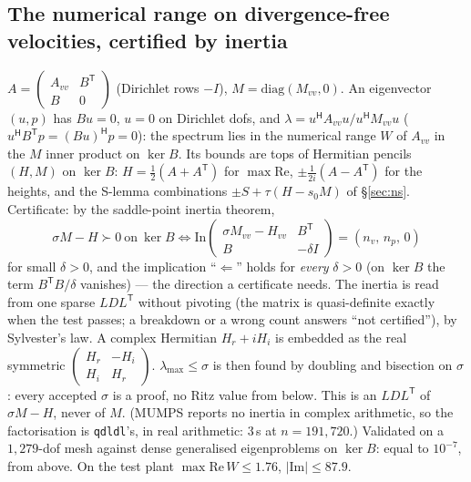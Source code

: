\documentclass[11pt,a4paper]{article}
\newcommand{\code}[1]{\texttt{#1}}
\newcommand{\hp}{^{\mathsf H}}
\newcommand{\tp}{^{\mathsf T}}   %
\begin{document}
{\subsection{The numerical range on divergence-free velocities, certified by inertia}
$A=\begin{pmatrix}A_{vv}&B\tp\\B&0\end{pmatrix}$ (Dirichlet rows $-I$), $M=\mathrm{diag}(M_{vv},0)$.
An eigenvector $(u,p)$ has $Bu=0$, $u=0$ on Dirichlet dofs, and
$\lambda=u\hp A_{vv}u/u\hp M_{vv}u$ ($u\hp B\tp p=(Bu)\hp p=0$): the spectrum lies in the
numerical range $W$ of $A_{vv}$ in the $M$ inner product on $\ker B$.  Its bounds are tops of
Hermitian pencils $(H,M)$ on $\ker B$: $H=\tfrac12(A+A\tp)$ for $\max\mathrm{Re}$, $\pm\tfrac1{2i}(A-A\tp)$
for the heights, and the S-lemma combinations $\pm S+\tau(H-s_0M)$ of \S\ref{sec:ns}.
Certificate: by the saddle-point inertia theorem,
\[
\sigma M-H\succ0\ \text{on}\ \ker B
\iff
\mathrm{In}\begin{pmatrix}\sigma M_{vv}-H_{vv}&B\tp\\B&-\delta I\end{pmatrix}=(n_v,\,n_p,\,0)
\]
for small $\delta>0$, and the implication ``$\Leftarrow$'' holds for \emph{every} $\delta>0$ (on
$\ker B$ the term $B\tp B/\delta$ vanishes) --- the direction a certificate needs.  The
inertia is read from one sparse $LDL\tp$ without pivoting (the matrix is quasi-definite
exactly when the test passes; a breakdown or a wrong count answers ``not certified''), by
Sylvester's law.  A complex Hermitian $H_r+iH_i$ is embedded as the real symmetric
$\begin{pmatrix}H_r&-H_i\\H_i&H_r\end{pmatrix}$.  $\lambda_{\max}\le\sigma$ is then found by doubling and
bisection on $\sigma$: every accepted $\sigma$ is a proof, no Ritz value from below.  This is
an $LDL\tp$ of $\sigma M-H$, never of $M$.  (MUMPS reports no inertia in complex arithmetic,
so the factorisation is \code{qdldl}'s, in real arithmetic: $3$\,s at $n=191{,}720$.)
Validated on a $1{,}279$-dof mesh against dense generalised eigenproblems on $\ker B$:
equal to $10^{-7}$, from above.  On the test plant $\max\mathrm{Re}\,W\le1.76$, $|\mathrm{Im}|\le87.9$.

}
\end{document}
